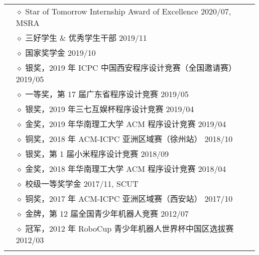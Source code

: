 \documentclass[letterpaper, 10pt]{article}
\begin{document}
\begin{longtable}{p{0.7in}p{6.0in}}
& $\diamond$ Star of Tomorrow Internship Award of Excellence \hfill 2020/07, MSRA \\

& $\diamond$ 三好学生 \& 优秀学生干部 \hfill 2019/11 \\

& $\diamond$ 国家奖学金 \hfill 2019/10 \\

& $\diamond$ 银奖，2019 年 ICPC 中国西安程序设计竞赛（全国邀请赛） \hfill 2019/05 \\

& $\diamond$ 一等奖，第 17 届广东省程序设计竞赛 \hfill 2019/05 \\

& $\diamond$ 银奖，2019 年三七互娱杯程序设计竞赛 \hfill 2019/04 \\

& $\diamond$ 金奖，2019 年华南理工大学 ACM 程序设计竞赛 \hfill 2019/04 \\

& $\diamond$ 铜奖，2018 年 ACM-ICPC 亚洲区域赛（徐州站） \hfill 2018/10 \\

& $\diamond$ 银奖，第 1 届小米程序设计竞赛 \hfill 2018/09 \\

& $\diamond$ 金奖，2018 年华南理工大学 ACM 程序设计竞赛 \hfill 2018/04 \\

& $\diamond$ 校级一等奖学金 \hfill 2017/11, SCUT \\

& $\diamond$ 铜奖，2017 年 ACM-ICPC 亚洲区域赛（西安站） \hfill 2017/10 \\

& $\diamond$ 金牌，第 12 届全国青少年机器人竞赛 \hfill 2012/07\\

& $\diamond$ 冠军，2012 年 RoboCup 青少年机器人世界杯中国区选拔赛 \hfill 2012/03 \\

& \\



\end{longtable}
\end{document}
